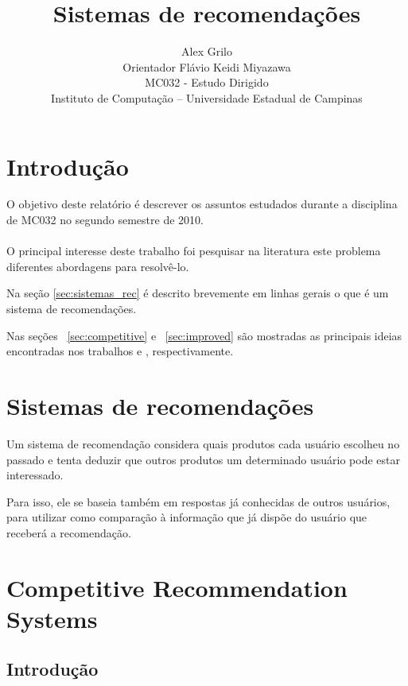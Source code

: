\documentclass[a4paper,10pt]{article}
\title{Sistemas de recomendações}
\author{Alex Grilo \\ Orientador Flávio Keidi Miyazawa\\ MC032 - Estudo Dirigido \\ \normalsize{Instituto de Computação -- Universidade Estadual de Campinas}}
\begin{document}
\maketitle

\newpage

\tableofcontents

\newpage

\newtheorem{definicao}{Definição}
\newtheorem{lema}{Lema}
\newtheorem{coro}{Corolário}
\newtheorem{teo}{Teorema}


\section{Introdução}

O objetivo deste relatório é descrever os assuntos estudados durante a 
disciplina de MC032 no segundo semestre de 2010.  \\ \\ 
O principal interesse deste trabalho foi pesquisar na literatura este
problema diferentes abordagens para resolvê-lo.

Na seção \ref{sec:sistemas_rec} é descrito brevemente em linhas gerais
o que é um sistema de recomendações.

Nas seções ~\ref{sec:competitive} e ~\ref{sec:improved} são mostradas as
principais ideias encontradas nos trabalhos  \cite{drineas} e \cite{baruch},
respectivamente.

\newpage

\section{Sistemas de recomendações}\label{sec:sitemas_rec}

Um sistema de recomendação considera quais produtos cada usuário
escolheu no passado e tenta deduzir que outros produtos um determinado
usuário pode estar interessado. 

Para isso, ele se baseia também em respostas já conhecidas de outros 
usuários, para utilizar como comparação à informação que já dispõe
do usuário que receberá a recomendação.

\newpage

\section{Competitive Recommendation Systems}\label{competitive}

\subsection{Introdução}
\end{document}
